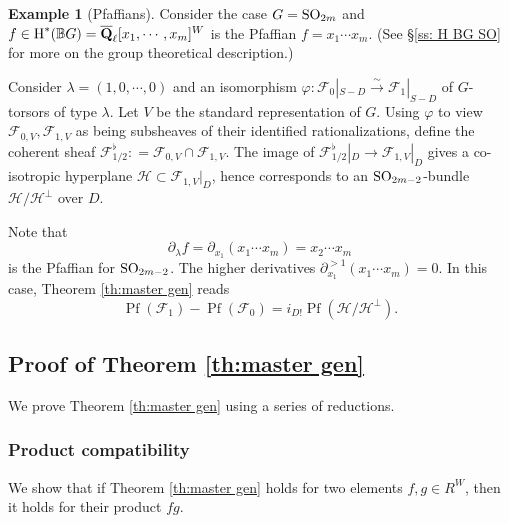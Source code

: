 \documentclass[reqno]{amsart}
\numberwithin{equation}{subsection}
\theoremstyle{definition}
\newtheorem{exam}[subsubsection]{Example}
\def\BB{\mathbb{B}}
\newcommand\cF{\mathcal{F}}
\newcommand\cH{\mathcal{H}}
\DeclareMathOperator\Pf{Pf}
\newcommand\SO{\textup{SO}}
\newcommand{\Qlbar}{\overline{\Q}_\ell}
\newcommand{\cohog}[2]{\textup{H}^{#1}({#2})}     %
\newcommand{\isom}{\stackrel{\sim}{\to}}
\newcommand{\ph}{\varphi}
\renewcommand{\l}{\lambda}
\newcommand\pl{\partial}
\newcommand{\Q}{\mathbf{Q}}
\begin{document}
\begin{exam}[Pfaffians] Consider the case $G=\SO_{2m}$ and $f\in \cohog{*}{\BB G}=\Qlbar[x_{1},\cdots, x_{m}]^{W}$ is the Pfaffian $f=x_{1}\cdots x_{m}$.  (See \S\ref{ss: H BG SO} for more on the group theoretical description.)

Consider $\l=(1,0,\cdots, 0)$ and an isomorphism $\ph: \cF_{0}|_{S-D}\isom \cF_{1}|_{S-D}$ of $G$-torsors of type $\l$. Let $V$ be the standard representation of $G$. Using $\ph$ to view $\cF_{0,V}, \cF_{1,V}$ as being subsheaves of their identified rationalizations, define the coherent sheaf $\cF^{\flat}_{1/2}: =\cF_{0,V}\cap \cF_{1,V}$. The image of $\cF^{\flat}_{1/2}|_{D}\to \cF_{1,V}|_{D}$ gives a co-isotropic hyperplane $\cH\subset \cF_{1,V}|_{D}$, hence corresponds to an $\SO_{2m-2}$-bundle $\cH/\cH^{\bot}$ over $D$. 

Note that
\begin{equation*}
\pl_{\l}f=\pl_{x_{1}}(x_{1}\cdots x_{m})=x_{2}\cdots x_{m}
\end{equation*}
is the Pfaffian for $\SO_{2m-2}$. The higher derivatives $\pl^{>1}_{x_{1}}(x_{1}\cdots x_{m})=0$. In this case, Theorem \ref{th:master gen} reads
\begin{equation*}
\Pf(\cF_{1})-\Pf(\cF_{0})=i_{D!}\Pf(\cH/\cH^{\bot}).
\end{equation*}
\end{exam}


\subsection{Proof of Theorem \ref{th:master gen}} We prove Theorem \ref{th:master gen} using a series of reductions. 


\subsubsection{Product compatibility}\label{sss:prod} We show that if Theorem \ref{th:master gen} holds for two elements $f, g\in R^{W}$, then it holds for their product $fg$.  
\end{document}
